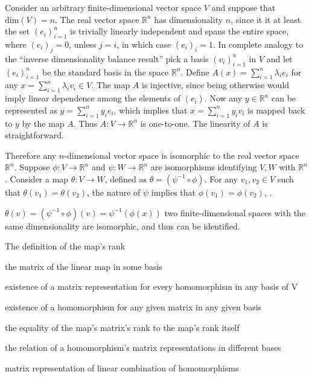 \documentclass[a4paper]{article}
\newcommand{\brac}[1]{\ensuremath{\left( #1 \right)}}
\newcommand{\Dim}[1]{\ensuremath{\text{dim}\brac{ #1 }}}
\begin{document}
Consider an arbitrary finite-dimensional vector space $V$ and suppose that $\Dim{V} = n$. The real vector space $\mathbb{R}^n$ has dimensionality $n$, since it it at least the set $\brac{e_i}_{i=1}^n$ is trivially linearly independent and spans the entire space, where $\brac{e_i}_j = 0$, unless $j=i$, in which case $\brac{e_i}_i=1$. In complete analogy to the ``inverse dimensionality balance result'' pick a basis $\brac{v_i}_{i=1}^n$ in $V$ and let $\brac{e_i}_{i=1}^n$ be the standard basis in the space $\mathbb{R}^n$. Define $A\brac{x} = \sum_{i=1}^n \lambda_i e_i$ for any $x = \sum_{i=1}^n \lambda_i v_i \in V$. The map $A$ is injective, since being otherwise would imply linear dependence among the elements of $\brac{e_i}$. Now any $y\in \mathbb{R}^n$ can be represented as $y = \sum_{i=1}^n y_i e_i$, which implies that $x=\sum_{i=1}^n y_i v_i$ is mapped back to $y$ by the map $A$. Thus $A:V\to \mathbb{R}^n$ is one-to-one. The linearity of $A$ is straightforward.

Therefore any $n$-dimensional vector space is isomorphic to the real vector space $\mathbb{R}^n$. Suppose $\phi:V\to \mathbb{R}^n$ and $\psi:W\to \mathbb{R}^n$ are isomorphisms identifying $V, W$ with $\mathbb{R}^n$. Consider a map $\theta:V\to W$, defined as $\theta = \brac{\psi^{-1}\circ \phi}$. For any $v_1, v_2\in V$ such that $\theta\brac{v_1} = \theta\brac{v_2}$, the nature of $\psi$ implies that $\phi\brac{v_1} = \phi\brac{v_2}$, .

$\theta\brac{v} = \brac{\psi^{-1}\circ \phi}\brac{v} = \psi^{-1}\brac{\phi\brac{x}}$
two finite-dimensional spaces with the same dimensionality are isomorphic, and thus can be identified.

The definition of the map's rank



the matrix of the linear map in some basis

existence of a matrix representation for every homomorphism in any basis of V

existence of a homomorphism for any given matrix in any given basis

the equality of the map's matrix's rank to the map's rank itself

the relation of a homomorphism's matrix representations in different bases

matrix representation of linear combination of homomorphisms
\end{document}
